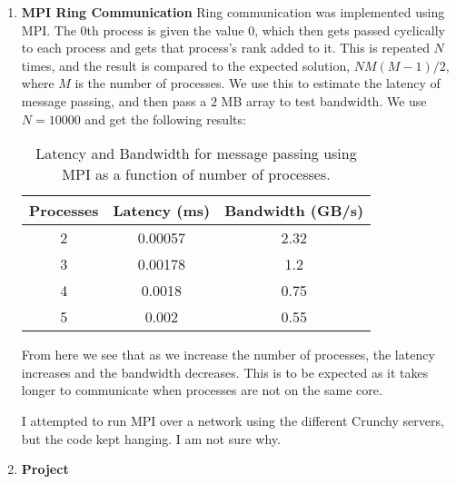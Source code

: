 \documentclass[11pt]{article}
\begin{document}
\begin{enumerate}

\item {\bf MPI Ring Communication} Ring communication was implemented using MPI. The 0th process is given the value $0$, which then gets passed cyclically to each process and gets that process's rank added to it. This is repeated $N$ times, and the result is compared to the expected solution, $NM(M-1)/2$, where $M$ is the number of processes. We use this to estimate the latency of message passing, and then pass a $2$ MB array to test bandwidth. We use $N=10000$ and get the following results:

\begin{table}[h!] 
	\centering
	\begin{tabular}{c | c c}
		Processes & Latency (ms) & Bandwidth (GB/s)  \\
		\hline
		2 & 0.00057 & 2.32 \\
		3 & 0.00178 & 1.2 \\ 
		4 & 0.0018 & 0.75 \\
		5 & 0.002 & 0.55 \\
	\end{tabular}
	\caption{Latency and Bandwidth for message passing using MPI as a function of number of processes. }
\end{table}

From here we see that as we increase the number of processes, the latency increases and the bandwidth decreases. This is to be expected as it takes longer to communicate when processes are not on the same core. 

I attempted to run MPI over a network using the different Crunchy servers, but the code kept hanging. I am not sure why.


\item {\bf Project}


\end{enumerate}
\end{document}
